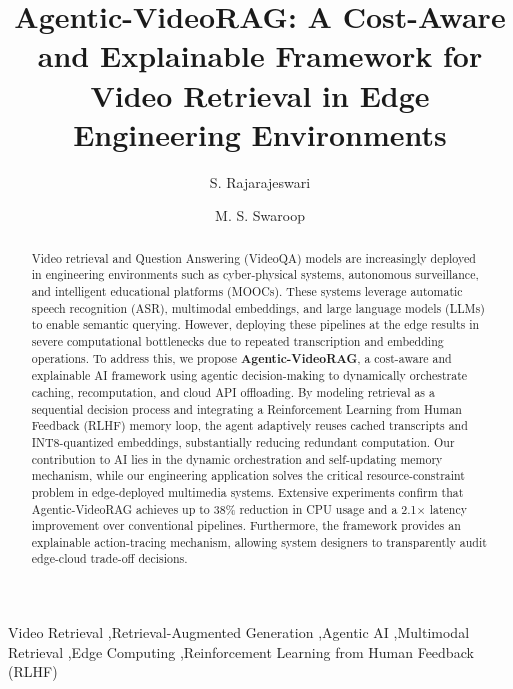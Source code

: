 \documentclass[preprint,12pt]{elsarticle}
\begin{document}
\begin{frontmatter}

\title{Agentic-VideoRAG: A Cost-Aware and Explainable Framework for Video Retrieval in Edge Engineering Environments}

\author[1]{S. Rajarajeswari}
\author[1]{M. S. Swaroop}

\address[1]{Department of Computer Science and Engineering, M S Ramaiah Institute of Technology, VTU, Bengaluru, India}

\begin{abstract}
Video retrieval and Question Answering (VideoQA) models are increasingly deployed in engineering environments such as cyber-physical systems, autonomous surveillance, and intelligent educational platforms (MOOCs). These systems leverage automatic speech recognition (ASR), multimodal embeddings, and large language models (LLMs) to enable semantic querying. However, deploying these pipelines at the edge results in severe computational bottlenecks due to repeated transcription and embedding operations. To address this, we propose \textbf{Agentic-VideoRAG}, a cost-aware and explainable AI framework using agentic decision-making to dynamically orchestrate caching, recomputation, and cloud API offloading. By modeling retrieval as a sequential decision process and integrating a Reinforcement Learning from Human Feedback (RLHF) memory loop, the agent adaptively reuses cached transcripts and INT8-quantized embeddings, substantially reducing redundant computation. Our contribution to AI lies in the dynamic orchestration and self-updating memory mechanism, while our engineering application solves the critical resource-constraint problem in edge-deployed multimedia systems. Extensive experiments confirm that Agentic-VideoRAG achieves up to 38\% reduction in CPU usage and a 2.1$\times$ latency improvement over conventional pipelines. Furthermore, the framework provides an explainable action-tracing mechanism, allowing system designers to transparently audit edge-cloud trade-off decisions. 
\end{abstract}

\begin{keyword}
Video Retrieval \sep Retrieval-Augmented Generation \sep Agentic AI \sep Multimodal Retrieval \sep Edge Computing \sep Reinforcement Learning from Human Feedback (RLHF)
\end{keyword}

\end{frontmatter}
\end{document}

